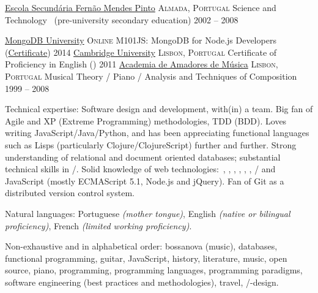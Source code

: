 \documentclass[10pt,a4paper]{article}
\begin{document}
\headedsection
  {\href{http://www.esfmp.pt}{Escola Secundária Fernão Mendes Pinto}}
  {\textsc{Almada, Portugal}} {
  \headedsubsection
    {Science and Technology \textnormal{~(pre-university secondary education)}}
    {2002 -- 2008}
    {}
}

\spacedhrule{0.5em}{-0.4em}

\headedsection
  {\href{https://university.mongodb.com}{MongoDB University}}
  {\textsc{Online}} {
  \headedsubsection
    {M101JS: MongoDB for Node.js Developers (\href{http://education.mongodb.com/downloads/certificates/b5bebce320c047bda51f89482ff28948/Certificate.pdf}{Certificate})}
    {2014}
    {}
}
\headedsection
  {\href{http://www.cambridgeenglish.org/}{Cambridge University}}
  {\textsc{Lisbon, Portugal}} {
  \headedsubsection
    {Certificate of Proficiency in English ()}
    {2011}
    {}
}
\headedsection
  {\href{http://www.academiaam.com/}{Academia de Amadores de Música}}
  {\textsc{Lisbon, Portugal}} {
  \headedsubsection
    {Musical Theory / Piano / Analysis and Techniques of Composition}
    {1999 -- 2008}
    {}
}

\spacedhrule{0.5em}{-0.4em}

\inlineheadsection  %
  {Technical expertise:}
  {Software design and development, with(in) a team.  Big fan of Agile and XP (Extreme Programming) methodologies, TDD (BDD).  Loves writing JavaScript/\nsp Java/\nsp Python, and has been appreciating functional languages such as Lisps (particularly Clojure/\nsp ClojureScript) further and further.  Strong understanding of relational and document oriented databases; substantial technical skills in /\nsp {}.  Solid knowledge of web technologies:\ , , , , , , /\nsp{} and JavaScript (mostly ECMAScript 5.1, Node.js and jQuery). Fan of Git as a distributed version control system.}

\vspace{0.5em}
\inlineheadsection
  {Natural languages:}
  {Portuguese \emph{(mother tongue)}, English \emph{(native or bilingual proficiency)}, French \emph{(limited working proficiency)}.}


\spacedhrule{1.6em}{-0.4em}


\inlineheadsection
  {Non-exhaustive and in alphabetical order:}
  {bossanova (music), databases, functional programming, guitar, JavaScript, history, literature, music, open source, piano, programming, programming languages, programming paradigms, software engineering (best practices and methodologies), travel, /-design.}
\end{document}
